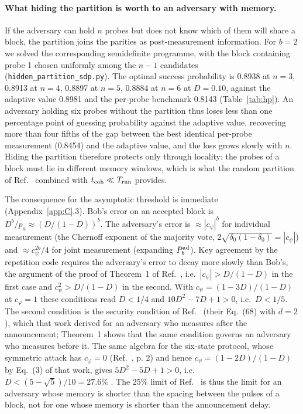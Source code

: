 \documentclass[aps,pra,twocolumn,superscriptaddress,nofootinbib]{revtex4-2}
\begin{document}
\paragraph*{What hiding the partition is worth to an adversary with memory.} If the adversary can hold $n$ probes but does not know which of them will share a block, the partition joins the parities as post-measurement information. For $b=2$ we solved the corresponding semidefinite programme, with the block containing probe 1 chosen uniformly among the $n-1$ candidates (\texttt{hidden\_partition\_sdp.py}). The optimal success probability is 0.8938 at $n=3$, 0.8913 at $n=4$, 0.8897 at $n=5$, 0.8884 at $n=6$ at $D=0.10$, against the adaptive value 0.8981 and the per-probe benchmark 0.8143 (Table~\ref{tab:hp}). An adversary holding six probes without the partition thus loses less than one percentage point of guessing probability against the adaptive value, recovering more than four fifths of the gap between the best identical per-probe measurement (0.8454) and the adaptive value, and the loss grows slowly with $n$. Hiding the partition therefore protects only through locality: the probes of a block must lie in different memory windows, which is what the random partition of Ref.~\cite{T25} combined with $t_{\rm coh}\ll T_{\rm run}$ provides.

The consequence for the asymptotic threshold is immediate (Appendix~\ref{app:C}.3). Bob's error on an accepted block is $D^b/p_a\approx(D/(1-D))^b$. The adversary's error is $\approx|c_\psi|^b$ for individual measurement (the Chernoff exponent of the majority vote, $2\sqrt{\delta_0(1-\delta_0)}=|c_\psi|$) and $\approx c_\psi^{2b}/4$ for joint measurement (expanding $P^{\rm ad}_b$). Key agreement by the repetition code requires the adversary's error to decay more slowly than Bob's, the argument of the proof of Theorem~1 of Ref.~\cite{GW99}, i.e.\ $|c_\psi|>D/(1-D)$ in the first case and $c_\psi^2>D/(1-D)$ in the second. With $c_\psi=(1-3D)/(1-D)$ at $c_\varphi=1$ these conditions read $D<1/4$ and $10D^2-7D+1>0$, i.e.\ $D<1/5$. The second condition is the security condition of Ref.~\cite{BA07} (their Eq.~(68) with $d=2$), which that work derived for an adversary who measures after the announcement; Theorem~1 shows that the same condition governs an adversary who measures before it. The same algebra for the six-state protocol, whose symmetric attack has $c_\varphi=0$ (Ref.~\cite{GW99}, p. 2) and hence $c_\psi=(1-2D)/(1-D)$ by Eq.~(3) of that work, gives $5D^2-5D+1>0$, i.e.\ $D<(5-\sqrt5)/10=27.6\%$ \cite{Chau02,ABBMM06}. The 25\% limit of Ref.~\cite{GW99} is thus the limit for an adversary whose memory is shorter than the spacing between the pulses of a block, not for one whose memory is shorter than the announcement delay.
\end{document}
